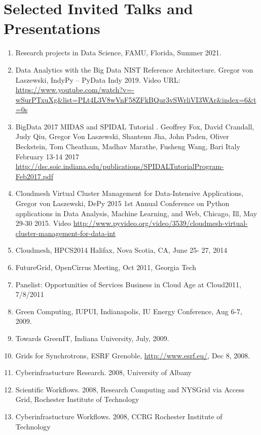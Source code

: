 \documentclass{article}
\begin{document}
\pbib



\section{Selected Invited Talks and Presentations} 

\begin{enumerate}
\item Research projects in Data Science, FAMU, Florida, Summer 2021.
\item  Data Analytics with the Big Data NIST Reference Architecture. Gregor von Laszewski, IndyPy – PyData Indy 2019. Video URL: \url{https://www.youtube.com/watch?v=-wSurPTxuXg&list=PLt4L3V8wVnF58ZFkBQur3vSWrliVI3WAr&index=6&t=0s}
\item  BigData 2017 MIDAS and SPIDAL Tutorial . Geoffrey Fox, David Crandall, Judy Qiu, Gregor Von Laszewski, Shantenu Jha, John Paden, Oliver Beckstein, Tom Cheatham, Madhav Marathe, Fusheng Wang, Bari Italy February 13-14 2017
\url{http://dsc.soic.indiana.edu/publications/SPIDALTutorialProgram-Feb2017.pdf}
\item  Cloudmesh Virtual Cluster Management for Data-Intensive Applications, Gregor von Laszewski, DePy 2015 1st Annual Conference on Python applications in Data Analysis, Machine Learning, and Web, Chicago, Ill, May 29-30 2015. Video \url{http://www.pyvideo.org/video/3539/cloudmesh-virtual-cluster-management-for-data-int}
\item  Cloudmesh, HPCS2014 Halifax, Nova Scotia, CA, June 25- 27, 2014
\item  FutureGrid, OpenCirrus Meeting, Oct 2011, Georgia Tech
\item  Panelist: Opportunities of Services Business in Cloud Age at Cloud2011, 7/8/2011 
\item  Green Computing,  IUPUI, Indianapolis, IU Energy Conference, Aug 6-7, 2009.
\item  Towards GreenIT, Indiana University, July, 2009. 
\item  Grids for Synchrotrons, ESRF Grenoble, \url{http://www.esrf.eu/}, Dec 8, 2008. 
\item  Cyberinfrastucture Research. 2008, University of Albany 
\item  Scientific Workflows. 2008, Research Computing and NYSGrid via Access Grid, Rochester Institute of Technology 
\item  Cyberinfrastucture Workflows. 2008, CCRG Rochester Institute of Technology 

\end{enumerate}
\end{document}
